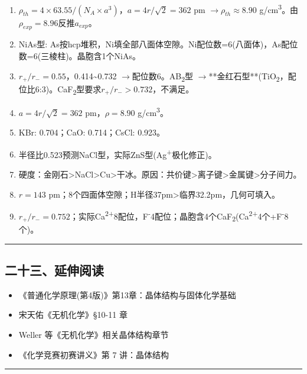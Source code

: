 \documentclass[a4paper,11pt]{ctexart}
\providecommand{\tightlist}{\setlength{\itemsep}{0pt}\setlength{\parskip}{0pt}}
\newcommand{\箭}{\ensuremath{\rightarrow}}
\newcommand{\左箭}{\ensuremath{\leftarrow}}
\newcommand{\上箭}{\ensuremath{\uparrow}}
\newcommand{\下箭}{\ensuremath{\downarrow}}
\newcommand{\衡}{\ensuremath{\rightleftharpoons}}
\newcommand{\双箭}{\ensuremath{\leftrightarrow}}
\newcommand{\约等于}{\ensuremath{\approx}}
\newcommand{\小于等于}{\ensuremath{\leq}}
\newcommand{\大于等于}{\ensuremath{\geq}}
\newcommand{\不等于}{\ensuremath{\neq}}
\newcommand{\西格马}{\ensuremath{\sigma}}
\newcommand{\派}{\ensuremath{\pi}}
\begin{document}
\begin{enumerate}
\item
  \(\rho_{th}=4\times63.55/(N_A\times a^3)\)，\(a=4r/\sqrt{2}=362\) pm \箭 \(\rho_{th}\approx8.90\) g/cm\textsuperscript{3}。由\(\rho_{exp}=8.96\)反推\(a_{exp}\)。
\item
  NiAs型: As按hcp堆积，Ni填全部八面体空隙。Ni配位数=6(八面体)，As配位数=6(三棱柱)。晶胞含1个NiAs。
\item
  \(r_+/r_-=0.55\)，0.414\textasciitilde0.732 \箭 配位数6。AB\textsubscript{2}型 \箭 **金红石型**(TiO\textsubscript{2}，配位比6:3)。CaF\textsubscript{2}型要求\(r_+/r_->0.732\)，不满足。
\item
  \(a=4r/\sqrt{2}=362\) pm，\(\rho=8.90\) g/cm\textsuperscript{3}。
\item
  KBr: 0.704；CaO: 0.714；CsCl: 0.923。
\item
  半径比0.523预测NaCl型，实际ZnS型(Ag\textsuperscript{+}极化修正)。
\item
  硬度：金刚石\textgreater NaCl\textgreater Cu\textgreater 干冰。原因：共价键\textgreater 离子键\textgreater 金属键\textgreater 分子间力。
\item
  \(r=143\) pm；8个四面体空隙；H半径37pm\textgreater 临界32.2pm，几何可填入。
\item
  \(r_+/r_-=0.752\)；实际Ca\textsuperscript{2+}8配位，F\textsuperscript{-}4配位；晶胞含4个CaF\textsubscript{2}(Ca\textsuperscript{2+}4个+F\textsuperscript{-}8个)。
\end{enumerate}

\begin{center}\rule{0.5\linewidth}{0.5pt}\end{center}

\subsection{二十三、延伸阅读}\label{ux4e8cux5341ux4e09ux5ef6ux4f38ux9605ux8bfb}

\begin{itemize}
\tightlist
\item
  《普通化学原理(第4版)》第13章：晶体结构与固体化学基础
\item
  宋天佑《无机化学》§10-11 章
\item
  Weller 等《无机化学》相关晶体结构章节
\item
  《化学竞赛初赛讲义》第 7 讲：晶体结构
\end{itemize}

\begin{center}\rule{0.5\linewidth}{0.5pt}\end{center}
\end{document}
